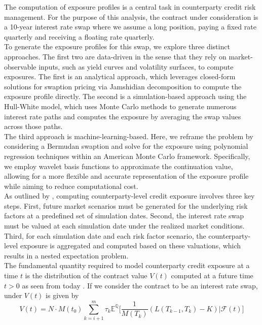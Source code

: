     \noindent
    
    
    The computation of exposure profiles is a central task in counterparty credit risk management. For the purpose of this analysis, the contract under consideration is a 10-year interest rate swap where we assume a long position, paying a fixed rate quarterly and receiving a floating rate quarterly.\\

    \noindent
    To generate the exposure profiles for this swap, we explore three distinct approaches. The first two are data-driven in the sense that they rely on market-observable inputs, such as yield curves and volatility surfaces, to compute exposures. The first is an analytical approach, which leverages closed-form solutions for swaption pricing via Jamshidian decomposition to compute the exposure profile directly. The second is a simulation-based approach using the Hull-White model, which uses Monte Carlo methods to generate numerous interest rate paths and computes the exposure by averaging the swap values across those paths.\\

    \noindent
    The third approach is machine-learning-based. Here, we reframe the problem by considering a Bermudan swaption and solve for the exposure using polynomial regression techniques within an American Monte Carlo framework. Specifically, we employ wavelet basis functions to approximate the continuation value, allowing for a more flexible and accurate representation of the exposure profile while aiming to reduce computational cost. \\

    \noindent
    As outlined by \cite{zhu2007guide}, computing counterparty-level credit exposure involves three key steps. First, future market scenarios must be generated for the underlying risk factors at a predefined set of simulation dates. Second, the interest rate swap must be valued at each simulation date under the realized market conditions. Third, for each simulation date and each risk factor scenario, the counterparty-level exposure is aggregated and computed based on these valuations, which results in a nested expectation problem.\\

    \noindent
    The fundamental quantity required to model counterparty credit exposure at a time $t$ is the distribution of the contract value $V(t)$ computed at a future time $t>0$ as seen from today \cite{cesari2009modelling}. If we consider the contract to be an interest rate swap, under $V(t)$ is given by
    \begin{equation}
    V(t) = N \cdot M(t_0) \sum_{k=i+1}^{m} \tau_k \mathbb{E} ^\mathbb{Q} \Bigg[ \frac{1}{M(T_k)} \left( L (T_{k-1},T_k) - K\right) \Big| \mathscr{F}(t) \Bigg]
    \label{eq:swap_value}
    \end{equation}
    
